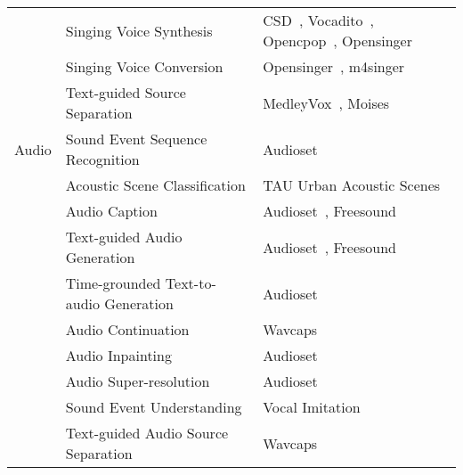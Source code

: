\begin{longtable}{p{1cm}p{6cm}p{6cm}}
    & Singing Voice Synthesis & CSD~\citep{choi2020children}, Vocadito~\citep{bittner2021vocadito}, Opencpop~\citep{wang2022opencpop}, Opensinger~\citep{huang2021multi} \\  \cline{2-3} %

    & Singing Voice Conversion & Opensinger~\citep{huang2021multi}, m4singer~\citep{zhang2022m4singer} \\  \cline{2-3} %

    & Text-guided Source Separation & MedleyVox~\citep{jeon2023medleyvox}, Moises~\citep{pereira2023moisesdb} \\ 
\midrule

Audio & Sound Event Sequence Recognition & Audioset~\citep{45857} \\ \cline{2-3} %

    \multirow{17}{*}{} & Acoustic Scene Classification & TAU Urban Acoustic Scenes~\citep{heittola2020acoustic} \\ \cline{2-3} %



    & Audio Caption &  Audioset~\citep{45857}, Freesound~\citep{font2013freesound} \\ \cline{2-3} %

    & Text-guided Audio Generation & Audioset~\citep{45857}, Freesound~\citep{font2013freesound} \\ \cline{2-3} %

    & Time-grounded Text-to-audio Generation & Audioset~\citep{45857} \\ \cline{2-3} %
    
    & Audio Continuation & Wavcaps~\citep{mei2023wavcaps} \\ \cline{2-3} %

    & Audio Inpainting & Audioset~\citep{45857} \\ \cline{2-3} %

    & Audio Super-resolution & Audioset~\citep{45857} \\ \cline{2-3} %


    & Sound Event Understanding & Vocal Imitation~\citep{kim2018vocal} \\ \cline{2-3} %

    & Text-guided Audio Source Separation & Wavcaps~\citep{mei2023wavcaps} \\ \cline{2-3} %


\end{longtable}

